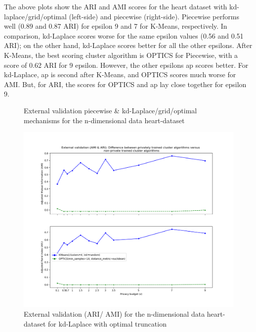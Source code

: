 The above plots show the ARI and AMI scores for the heart dataset with kd-laplace/grid/optimal (left-side) and piecewise (right-side).
Piecewise performs well (0.89 and 0.87 ARI) for epsilon 9 and 7 for K-Means, respectively.
In comparison, kd-Laplace scores worse for the same epsilon values (0.56 and 0.51 ARI); on the other hand, kd-Laplace scores better for all the other epsilons.
After K-Means, the best scoring cluster algorithm is OPTICS for Piecewise, with a score of 0.62 ARI for 9 epsilon.
However, the other epsilons \gls{ap} scores better. For kd-Laplace, \gls{ap} is second after K-Means, and OPTICS scores much worse for AMI.
But, for ARI, the scores for OPTICS and \gls{ap} lay close together for epsilon 9.
\begin{figure}[H]
    \caption{External validation piecewise \& kd-Laplace/grid/optimal mechanisms for the n-dimensional data heart-dataset}
    \centering
    \begin{minipage}[c]{0.60\textwidth}
        \includegraphics[width=1\textwidth]{Results/nd-laplace-optimal-truncated/heart-dataset/ami-and-ari.png}
        \caption{External validation (ARI/ AMI) for the n-dimensional data heart-dataset for kd-Laplace with optimal truncation}
        \label{fig:external-validation-heart-dataset_comparison_nd-laplace}
    \end{minipage}
    \begin{minipage}[c]{0.60\textwidth}

\end{minipage}
\end{figure}
